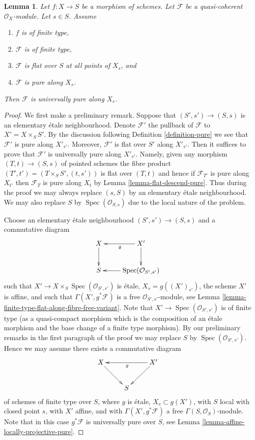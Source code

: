 \documentclass[10pt,a4paper]{amsart}
\theoremstyle{plain}
\newtheorem{lemma}[subsection]{Lemma}
\theoremstyle{definition}
\theoremstyle{remark}
\numberwithin{equation}{subsection}
\def\Spec{\mathop{\mathrm{Spec}}}
\begin{document}
\begin{lemma}
\label{lemma-finite-type-flat-pure-along-fibre-is-universal}
Let $f : X \to S$ be a morphism of schemes.
Let $\mathcal{F}$ be a quasi-coherent $\mathcal{O}_X$-module.
Let $s \in S$.
Assume
\begin{enumerate}
\item $f$ is of finite type,
\item $\mathcal{F}$ is of finite type,
\item $\mathcal{F}$ is flat over $S$ at all points of $X_s$, and
\item $\mathcal{F}$ is pure along $X_s$.
\end{enumerate}
Then $\mathcal{F}$ is universally pure along $X_s$.
\end{lemma}

\begin{proof}
We first make a preliminary remark. Suppose that $(S', s') \to (S, s)$
is an elementary \'etale neighbourhood. Denote $\mathcal{F}'$ the
pullback of $\mathcal{F}$ to $X' = X \times_S S'$.
By the discussion following
Definition \ref{definition-pure}
we see that $\mathcal{F}'$ is pure along $X'_{s'}$. Moreover, $\mathcal{F}'$
is flat over $S'$ along $X'_{s'}$. Then it suffices to prove
that $\mathcal{F}'$ is universally pure along $X'_{s'}$. Namely, given
any morphism $(T, t) \to (S, s)$ of pointed schemes
the fibre product $(T', t') = (T \times_S S', (t, s'))$ is flat over $(T, t)$
and hence if $\mathcal{F}_{T'}$ is pure along $X_{t'}$ then
$\mathcal{F}_T$ is pure along $X_t$ by
Lemma \ref{lemma-flat-descend-pure}.
Thus during the proof we may always replace $(s, S)$ by an elementary
\'etale neighbourhood.
We may also replace $S$ by $\Spec(\mathcal{O}_{S, s})$
due to the local nature of the problem.

\medskip\noindent
Choose an elementary \'etale neighbourhood $(S', s') \to (S, s)$ and
a commutative diagram
$$
\xymatrix{
X \ar[d] & X' \ar[l]^g \ar[d] \\
S & \Spec(\mathcal{O}_{S', s'}) \ar[l]
}
$$
such that $X' \to X \times_S \Spec(\mathcal{O}_{S', s'})$
is \'etale, $X_s = g((X')_{s'})$, the scheme $X'$ is affine,
and such that $\Gamma(X', g^*\mathcal{F})$ is a free
$\mathcal{O}_{S', s'}$-module, see
Lemma \ref{lemma-finite-type-flat-along-fibre-free-variant}.
Note that $X' \to \Spec(\mathcal{O}_{S', s'})$ is of finite type
(as a quasi-compact morphism which is the composition of an \'etale morphism
and the base change of a finite type morphism).
By our preliminary remarks in the first paragraph of the proof
we may replace $S$ by $\Spec(\mathcal{O}_{S', s'})$. Hence
we may assume there exists a commutative diagram
$$
\xymatrix{
X \ar[dr] & & X' \ar[ll]^g \ar[ld] \\
& S &
}
$$
of schemes of finite type over $S$, where $g$ is \'etale, $X_s \subset g(X')$,
with $S$ local with closed point $s$, with $X'$ affine, and with
$\Gamma(X', g^*\mathcal{F})$ a free $\Gamma(S, \mathcal{O}_S)$-module.
Note that in this case $g^*\mathcal{F}$ is universally pure over $S$, see
Lemma \ref{lemma-affine-locally-projective-pure}.


\end{proof}
\end{document}
